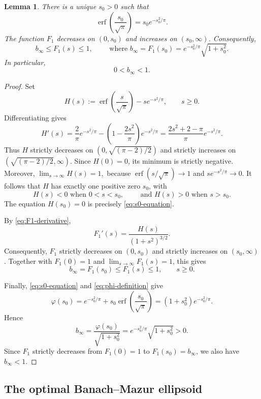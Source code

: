 \documentclass[11pt]{article}
\newtheorem{lemma}[theorem]{Lemma}
\theoremstyle{definition}
\theoremstyle{remark}
\newcommand{\erf}{\operatorname{erf}}
\begin{document}
\begin{lemma}\label{lem:b-infty-minimum}
There is a unique $s_0>0$ such that
\begin{equation}\label{eq:s0-equation}
 \erf\!\left(\frac{s_0}{\sqrt\pi}\right)
 =s_0e^{-s_0^2/\pi}.
\end{equation}
The function $F_1$ decreases on $(0,s_0)$ and increases on
$(s_0,\infty)$.  Consequently,
\begin{equation}\label{eq:F1-range}
 b_\infty\leq F_1(s)\leq1,
 \qquad \mbox{ where }
 b_\infty=F_1(s_0)
 =e^{-s_0^2/\pi}\sqrt{1+s_0^2}.
\end{equation}
In particular,
\[
 0<b_\infty<1.
\]
\end{lemma}


\begin{proof}
Set
\[
 H(s):=\erf\!\left(\frac{s}{\sqrt\pi}\right)
       -se^{-s^2/\pi},
 \qquad s\geq0.
\]
Differentiating gives
\[
 H'(s)
 =\frac2\pi e^{-s^2/\pi}
  -\left(1-\frac{2s^2}{\pi}\right)e^{-s^2/\pi}
 =\frac{2s^2+2-\pi}{\pi}e^{-s^2/\pi}.
\]
Thus $H$ strictly decreases on
$(0,\sqrt{(\pi-2)/2})$ and strictly increases on
$(\sqrt{(\pi-2)/2},\infty)$.
Since $H(0)=0$, its minimum is strictly negative.
Moreover,
$
 \lim_{s\to\infty}H(s)=1,
$
because $\erf(s/\sqrt\pi)\to1$ and
$se^{-s^2/\pi}\to0$.
It follows that $H$ has exactly one positive zero $s_0$,
with
\[
 H(s)<0 \mbox{ when } 0<s<s_0,
 \qquad \mbox{ and }
 H(s)>0 \mbox{ when } s>s_0.
\]
The equation $H(s_0)=0$ is precisely
\eqref{eq:s0-equation}.

By \eqref{eq:F1-derivative},
\[
 F_1'(s)=\frac{H(s)}{(1+s^2)^{3/2}}.
\]
Consequently, $F_1$ strictly decreases on $(0,s_0)$ and
strictly increases on $(s_0,\infty)$. Together with
$F_1(0)=1$ and $\lim_{s\to\infty}F_1(s)=1$, this gives
\[
 b_\infty=F_1(s_0)\leq F_1(s)\leq1,
 \qquad s\geq0.
\]

Finally, \eqref{eq:s0-equation} and
\eqref{eq:phi-definition} give
\[
 \varphi(s_0)
 =e^{-s_0^2/\pi}
  +s_0\erf\!\left(\frac{s_0}{\sqrt\pi}\right)
 =(1+s_0^2)e^{-s_0^2/\pi}.
\]
Hence
\[
 b_\infty
 =\frac{\varphi(s_0)}{\sqrt{1+s_0^2}}
 =e^{-s_0^2/\pi}\sqrt{1+s_0^2}>0.
\]
Since $F_1$ strictly decreases from $F_1(0)=1$ to
$F_1(s_0)=b_\infty$, we also have $b_\infty<1$.
\end{proof}

\subsection{The optimal Banach--Mazur ellipsoid}
\end{document}
